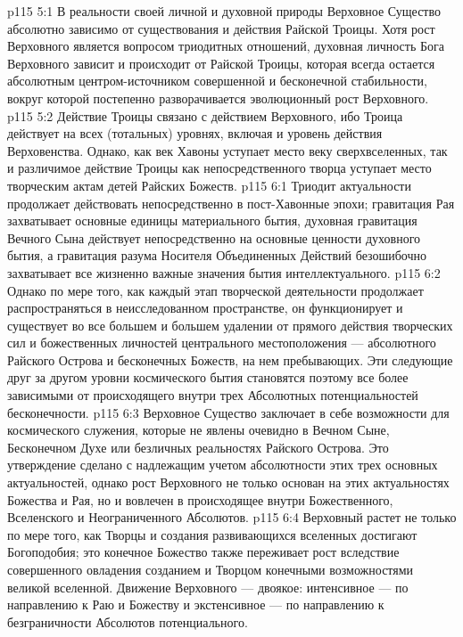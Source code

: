 \vs p115 5:1 В реальности своей личной и духовной природы Верховное Существо абсолютно зависимо от существования и действия Райской Троицы. Хотя рост Верховного является вопросом триодитных отношений, духовная личность Бога Верховного зависит и происходит от Райской Троицы, которая всегда остается абсолютным центром\hyp{}источником совершенной и бесконечной стабильности, вокруг которой постепенно разворачивается эволюционный рост Верховного.
\vs p115 5:2 Действие Троицы связано с действием Верховного, ибо Троица действует на всех (тотальных) уровнях, включая и уровень действия Верховенства. Однако, как век Хавоны уступает место веку сверхвселенных, так и различимое действие Троицы как непосредственного творца уступает место творческим актам детей Райских Божеств.
\vs p115 6:1 Триодит актуальности продолжает действовать непосредственно в пост\hyp{}Хавонные эпохи; гравитация Рая захватывает основные единицы материального бытия, духовная гравитация Вечного Сына действует непосредственно на основные ценности духовного бытия, а гравитация разума Носителя Объединенных Действий безошибочно захватывает все жизненно важные значения бытия интеллектуального.
\vs p115 6:2 Однако по мере того, как каждый этап творческой деятельности продолжает распространяться в неисследованном пространстве, он функционирует и существует во все большем и большем удалении от прямого действия творческих сил и божественных личностей центрального местоположения --- абсолютного Райского Острова и бесконечных Божеств, на нем пребывающих. Эти следующие друг за другом уровни космического бытия становятся поэтому все более зависимыми от происходящего внутри трех Абсолютных потенциальностей бесконечности.
\vs p115 6:3 Верховное Существо заключает в себе возможности для космического служения, которые не явлены очевидно в Вечном Сыне, Бесконечном Духе или безличных реальностях Райского Острова. Это утверждение сделано с надлежащим учетом абсолютности этих трех основных актуальностей, однако рост Верховного не только основан на этих актуальностях Божества и Рая, но и вовлечен в происходящее внутри Божественного, Вселенского и Неограниченного Абсолютов.
\vs p115 6:4 \pc Верховный растет не только по мере того, как Творцы и создания развивающихся вселенных достигают Богоподобия; это конечное Божество также переживает рост вследствие совершенного овладения созданием и Творцом конечными возможностями великой вселенной. Движение Верховного --- двоякое: интенсивное --- по направлению к Раю и Божеству и экстенсивное --- по направлению к безграничности Абсолютов потенциального.
